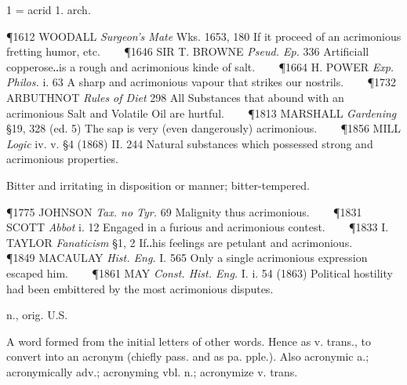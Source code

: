\begin{description}[wide, labelwidth=!, labelindent=0pt]
\noindent  {}

\vspace{-0.3cm}

\begin{myenumerate}
 1 = acrid 1. arch. 

\P 1612 WOODALL \textit{Surgeon's Mate} Wks. 1653, 180 If it proceed of an acrimonious fretting humor, etc.    
\P 1646 SIR T. BROWNE \textit{Pseud. Ep.} 336 Artificiall copperose‥is a rough and acrimonious kinde of salt.    
\P 1664 H. POWER \textit{Exp. Philos.} i. 63 A sharp and acrimonious vapour that strikes our nostrils.    
\P 1732 ARBUTHNOT \textit{Rules of Diet} 298 All Substances that abound with an acrimonious Salt and Volatile Oil are hurtful.    
\P 1813 MARSHALL \textit{Gardening} §19, 328 (ed. 5) The sap is very (even dangerously) acrimonious.    
\P 1856 MILL \textit{Logic} iv. v. §4 (1868) II. 244 Natural substances which possessed strong and acrimonious properties.

 Bitter and irritating in disposition or manner; bitter-tempered. 

\P 1775 JOHNSON \textit{Tax. no Tyr.} 69 Malignity thus acrimonious.    
\P 1831 SCOTT \textit{Abbot} i. 12 Engaged in a furious and acrimonious contest.    
\P 1833 I. TAYLOR \textit{Fanaticism} §1, 2 If‥his feelings are petulant and acrimonious.    
\P 1849 MACAULAY \textit{Hist. Eng.} I. 565 Only a single acrimonious expression escaped him.    
\P 1861 MAY \textit{Const. Hist. Eng.} I. i. 54 (1863) Political hostility had been embittered by the most acrimonious disputes.
\end{myenumerate}


  n., orig. U.S.

\noindent  {}


\noindent
A word formed from the initial letters of other words. Hence as v. trans., to convert into an acronym (chiefly pass. and as pa. pple.). 
Also acronymic a.; acronymically adv.; acronyming vbl. n.; acronymize v. trans. 


\end{description}
